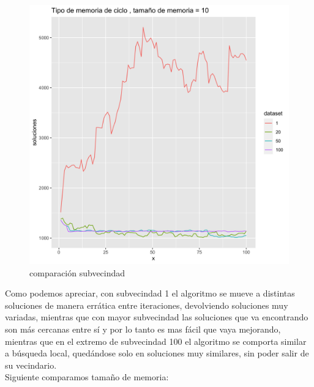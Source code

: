 \documentclass[10pt,a4paper]{article}
\begin{document}
\begin{figure} [H]
    \centering
    \includegraphics[scale=0.15]{img/grafico.png}
    \caption{comparación subvecindad}
    \label{fig:sv}
\end{figure}

Como podemos apreciar, con subvecindad 1 el algoritmo se mueve a distintas soluciones de manera errática  entre iteraciones, devolviendo soluciones muy variadas, mientras que con mayor subvecindad las soluciones que va encontrando son más cercanas entre sí y por lo tanto es mas fácil que vaya mejorando, mientras que en el extremo de subvecindad 100 el algoritmo se comporta similar a búsqueda local, quedándose solo en soluciones muy similares, sin poder salir de su vecindario. \\

Siguiente comparamos tamaño de memoria:
\end{document}
